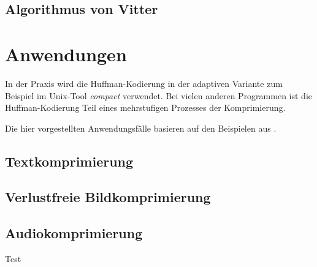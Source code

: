 \documentclass[twoside,11pt,a4paper]{article}
\theoremstyle{break}
\begin{document}

\subsection{Algorithmus von Vitter}

\section{Anwendungen}

In der Praxis wird die Huffman-Kodierung in der adaptiven Variante zum Beispiel
im Unix-Tool \emph{compact} verwendet. Bei vielen anderen Programmen ist die
Huffman-Kodierung Teil eines mehrstufigen Prozesses der Komprimierung.


Die hier vorgestellten Anwendungsfälle basieren auf den Beispielen aus
\cite{Sayood:2006}.

\subsection{Textkomprimierung}

\subsection{Verlustfreie Bildkomprimierung}

\subsection{Audiokomprimierung}


Test \cite{Salomon:2010}  \cite{Williams:1991}



\end{document}
